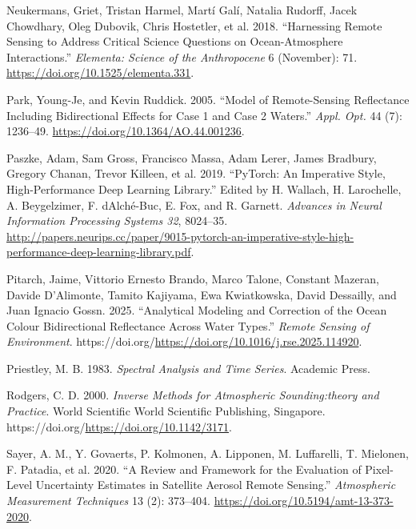 \documentclass[
  11pt,
  letterpaper,
  DIV=11,
  numbers=noendperiod]{scrreprt}
\newlength{\cslhangindent}
\newenvironment{CSLReferences}[2] %
 {\begin{list}{}{%
  \setlength{\itemindent}{0pt}
  \setlength{\leftmargin}{0pt}
  \setlength{\parsep}{0pt}
  \ifodd #1
   \setlength{\leftmargin}{\cslhangindent}
   \setlength{\itemindent}{-1\cslhangindent}
  \fi
  \setlength{\itemsep}{#2\baselineskip}}}
 {\end{list}}
\begin{document}
\begin{CSLReferences}{1}{0}
Neukermans, Griet, Tristan Harmel, Martí Galí, Natalia Rudorff, Jacek
Chowdhary, Oleg Dubovik, Chris Hostetler, et al. 2018. {``Harnessing
Remote Sensing to Address Critical Science Questions on Ocean-Atmosphere
Interactions.''} \emph{Elementa: Science of the Anthropocene} 6
(November): 71. \url{https://doi.org/10.1525/elementa.331}.

Park, Young-Je, and Kevin Ruddick. 2005. {``Model of Remote-Sensing
Reflectance Including Bidirectional Effects for Case 1 and Case 2
Waters.''} \emph{Appl. Opt.} 44 (7): 1236--49.
\url{https://doi.org/10.1364/AO.44.001236}.

Paszke, Adam, Sam Gross, Francisco Massa, Adam Lerer, James Bradbury,
Gregory Chanan, Trevor Killeen, et al. 2019. {``PyTorch: An Imperative
Style, High-Performance Deep Learning Library.''} Edited by H. Wallach,
H. Larochelle, A. Beygelzimer, F. dAlché-Buc, E. Fox, and R. Garnett.
\emph{Advances in Neural Information Processing Systems 32}, 8024--35.
\url{http://papers.neurips.cc/paper/9015-pytorch-an-imperative-style-high-performance-deep-learning-library.pdf}.

Pitarch, Jaime, Vittorio Ernesto Brando, Marco Talone, Constant Mazeran,
Davide D'Alimonte, Tamito Kajiyama, Ewa Kwiatkowska, David Dessailly,
and Juan Ignacio Gossn. 2025. {``Analytical Modeling and Correction of
the Ocean Colour Bidirectional Reflectance Across Water Types.''}
\emph{Remote Sensing of Environment}.
https://doi.org/\url{https://doi.org/10.1016/j.rse.2025.114920}.

Priestley, M. B. 1983. \emph{Spectral Analysis and Time Series}.
Academic Press.

Rodgers, C. D. 2000. \emph{Inverse Methods for Atmospheric
Sounding:theory and Practice}. World Scientific World Scientific
Publishing, Singapore.
https://doi.org/\url{https://doi.org/10.1142/3171}.

Sayer, A. M., Y. Govaerts, P. Kolmonen, A. Lipponen, M. Luffarelli, T.
Mielonen, F. Patadia, et al. 2020. {``A Review and Framework for the
Evaluation of Pixel-Level Uncertainty Estimates in Satellite Aerosol
Remote Sensing.''} \emph{Atmospheric Measurement Techniques} 13 (2):
373--404. \url{https://doi.org/10.5194/amt-13-373-2020}.


\end{CSLReferences}
\end{document}
